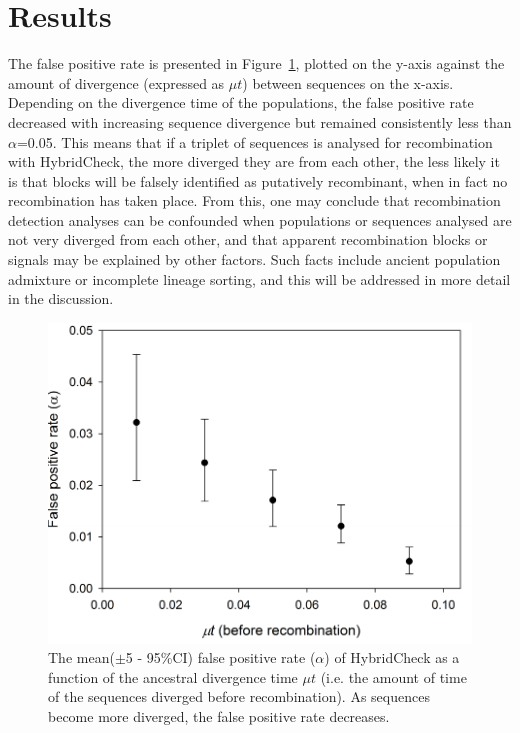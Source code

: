 \section{Results}
The false positive rate is presented in Figure~\ref{fig:HC_False}, plotted on the y-axis against the amount of divergence (expressed as $\mu t$) between sequences on the x-axis. Depending on the divergence time of the populations, the false positive rate decreased with increasing sequence divergence but remained consistently less than $\alpha$=0.05.
This means that if a triplet of sequences is analysed for recombination with HybridCheck, the more diverged they are from each other, the less likely it is that blocks will be falsely identified as putatively recombinant, when in fact no recombination has taken place. From this, one may conclude that recombination detection analyses can be confounded when populations or sequences analysed are not very diverged from each other, and that apparent recombination blocks or signals may be explained by other factors. Such facts include ancient population admixture or incomplete lineage sorting, and this will be addressed in more detail in the discussion.  

\begin{figure}
	\includegraphics{Figures/HybridCheck/HC_FalseRate}
    \caption{\label{fig:HC_False}The mean($\pm$5 - 95\%CI) false positive rate ($\alpha$) of HybridCheck as a function of the ancestral divergence time $\mu t$ (i.e. the amount of time of the sequences diverged before recombination). As sequences become more diverged, the false positive rate decreases.}
\end{figure}

